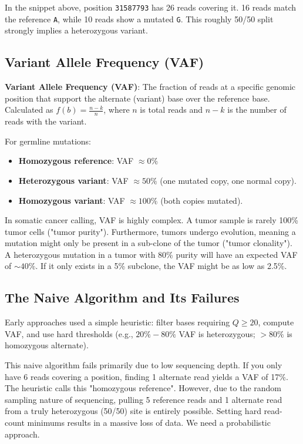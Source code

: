 In the snippet above, position \texttt{31587793} has 26 reads covering it. 16 reads match the reference \texttt{A}, while 10 reads show a mutated \texttt{G}. This roughly 50/50 split strongly implies a heterozygous variant.

\subsection{Variant Allele Frequency (VAF)}

\begin{important}
  \textbf{Variant Allele Frequency (VAF)}: The fraction of reads at a specific genomic position that support the alternate (variant) base over the reference base. Calculated as $f(b) = \frac{n-k}{n}$, where $n$ is total reads and $n-k$ is the number of reads with the variant.
\end{important}

For germline mutations:
\begin{itemize}
  \item \textbf{Homozygous reference}: VAF $\approx 0\%$
  \item \textbf{Heterozygous variant}: VAF $\approx 50\%$ (one mutated copy, one normal copy).
  \item \textbf{Homozygous variant}: VAF $\approx 100\%$ (both copies mutated).
\end{itemize}

\sta In somatic cancer calling, VAF is highly complex. A tumor sample is rarely 100\% tumor cells ("tumor purity"). Furthermore, tumors undergo evolution, meaning a mutation might only be present in a sub-clone of the tumor ("tumor clonality"). A heterozygous mutation in a tumor with 80\% purity will have an expected VAF of $\sim 40\%$. If it only exists in a 5\% subclone, the VAF might be as low as 2.5\%.

\subsection{The Naive Algorithm and Its Failures}

Early approaches used a simple heuristic: filter bases requiring $Q \ge 20$, compute VAF, and use hard thresholds (e.g., $20\%-80\%$ VAF is heterozygous; $>80\%$ is homozygous alternate).

This naive algorithm fails primarily due to low sequencing depth. If you only have 6 reads covering a position, finding 1 alternate read yields a VAF of 17\%. The heuristic calls this "homozygous reference". However, due to the random sampling nature of sequencing, pulling 5 reference reads and 1 alternate read from a truly heterozygous (50/50) site is entirely possible. Setting hard read-count minimums results in a massive loss of data. We need a probabilistic approach.

